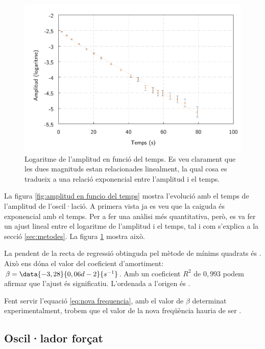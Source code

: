 \documentclass[12pt,a4paper]{article}
\begin{document}
\begin{figure}[htb]
  \centering
	\includegraphics[scale=0.6]{log(A).png}
	\caption{Logaritme de l'amplitud en funció del temps. Es veu clarament que les dues magnituds estan relacionades linealment, la qual cosa es tradueix a una relació exponencial entre l'amplitud i el temps.}
	\label{fig:log(amplitud) en funcio del temps}
\end{figure}

La figura \ref{fig:amplitud en funcio del temps} mostra l'evolució amb el temps de l'amplitud de l'oscil·lació. A primera vista ja es veu que la caiguda és exponencial amb el temps. Per a fer una anàlisi més quantitativa, però, es va fer un ajust lineal entre el logaritme de l'amplitud i el temps, tal i com s'explica a la secció \ref{sec:metodes}. La figura \ref{fig:log(amplitud) en funcio del temps} mostra això.

La pendent de la recta de regressió obtinguda pel mètode de mínims quadrats és . Això ens dóna el valor del coeficient d'amortiment: \( \beta = \data{-3,28}{0,06d-2}{s^{-1}} \). Amb un coeficient \( R^2 \) de \( 0,993 \) podem afirmar que l'ajust és significatiu. L'ordenada a l'origen és .

Fent servir l'equació \ref{eq:nova frequencia}, amb el valor de \( \beta \) determinat experimentalment, trobem que el valor de la nova freqüència hauria de ser .

\subsection{Oscil·lador forçat}
\end{document}
